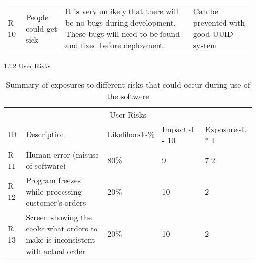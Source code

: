 \begin{table}
\begin{tabular}{llll}
        R-10 & People could get sick                                                                        & It is very unlikely that there will be no bugs during development. These bugs will need to be found and fixed before deployment.                                                                                                                                       & Can be prevented with good UUID system
    \end{tabular}
\end{table}


12.2 User Risks

\begin{table}
    \centering
    \caption{Summary of exposures to different risks that could occur during use of the software}
    \begin{tabular}{lllll}
        \multicolumn{5}{c}{User Risks}                                                                                                                                                          \\
        ID   & Description                                                                    & Likelihood\textasciitilde{}\% & Impact\textasciitilde{}1 - 10 & Exposure\textasciitilde{}L * I  \\
        R-11 & Human error (misuse of software)                                               & 80\%                          & 9                             & 7.2                             \\
        R-12 & Program freezes while processing customer’s orders                             & 20\%                          & 10                            & 2                               \\
        R-13 & Screen showing the cooks what orders to make is inconsistent with actual order & 20\%                          & 10                            & 2
    \end{tabular}
\end{table}


